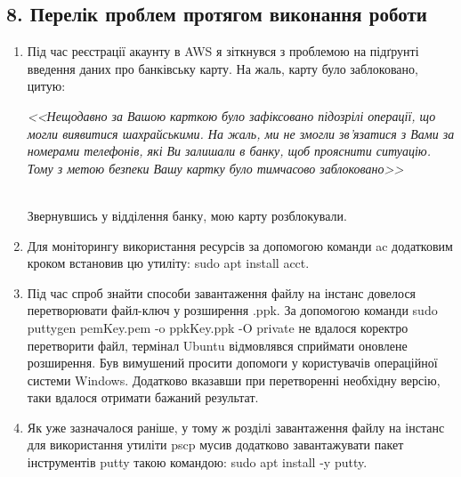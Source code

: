 \documentclass[a4paper,14pt]{extarticle}
\begin{document}
\subsection*{8. Перелік проблем протягом виконання роботи}

\begin{enumerate}
    \item Під час реєстрації акаунту в AWS я зіткнувся з проблемою на 
    підґрунті введення даних про банківську карту. На жаль, карту було 
    заблоковано, цитую: \\
     
    \parbox{\linewidth}{\textit{<<Нещодавно за Вашою карткою було зафіксовано 
    підозрілі операції, що могли виявитися шахрайськими. На жаль, ми не змогли 
    зв’язатися з Вами за номерами телефонів, які Ви залишали в банку, 
    щоб прояснити ситуацію. Тому з метою безпеки Вашу картку було тимчасово 
    заблоковано>>}} \\

    Звернувшись у відділення банку, мою карту розблокували. 

    \item Для моніторингу використання ресурсів за допомогою команди {\ttfamily ac}
    додатковим кроком встановив цю утиліту: {\ttfamily sudo apt install acct}.

    \item Під час спроб знайти способи завантаження файлу на інстанс 
    довелося перетворювати файл-ключ у розширення {\ttfamily *.ppk}. 
    За допомогою команди {\ttfamily sudo puttygen pemKey.pem -o ppkKey.ppk -O private} 
    не вдалося коректро перетворити файл, термінал Ubuntu відмовлявся сприймати оновлене розширення. 
    Був вимушений просити допомоги у користувачів операційної системи Win\-dows. 
    Додатково вказавши при перетворенні необхідну версію, таки вдалося отримати бажаний результат. 

    \item Як уже зазначалося раніше, у тому ж розділі завантаження файлу на інстанс для 
    використання утиліти {\ttfamily pscp} мусив додатково завантажувати пакет інструментів 
    {\ttfamily putty} такою командою: {\ttfamily sudo apt install -y putty}.
\end{enumerate}
\end{document}
